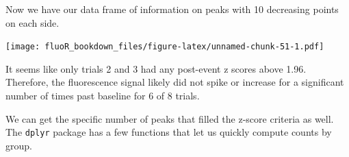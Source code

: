 \documentclass[
]{book}
\newenvironment{Shaded}{\begin{snugshade}}{\end{snugshade}}
\newcommand{\CommentTok}[1]{\textcolor[rgb]{0.56,0.35,0.01}{\textit{#1}}}
\newcommand{\ControlFlowTok}[1]{\textcolor[rgb]{0.13,0.29,0.53}{\textbf{#1}}}
\newcommand{\DataTypeTok}[1]{\textcolor[rgb]{0.13,0.29,0.53}{#1}}
\newcommand{\DecValTok}[1]{\textcolor[rgb]{0.00,0.00,0.81}{#1}}
\newcommand{\KeywordTok}[1]{\textcolor[rgb]{0.13,0.29,0.53}{\textbf{#1}}}
\newcommand{\NormalTok}[1]{#1}
\newcommand{\OperatorTok}[1]{\textcolor[rgb]{0.81,0.36,0.00}{\textbf{#1}}}
\newcommand{\StringTok}[1]{\textcolor[rgb]{0.31,0.60,0.02}{#1}}
\begin{document}
\begin{Shaded}
\end{Shaded}

Now we have our data frame of information on peaks with 10 decreasing points on each side.

\texttt{[image: fluoR\_bookdown\_files/figure-latex/unnamed-chunk-51-1.pdf]}

It seems like only trials 2 and 3 had any post-event z scores above 1.96. Therefore, the fluorescence signal likely did not spike or increase for a significant number of times past baseline for 6 of 8 trials.

We can get the specific number of peaks that filled the z-score criteria as well. The \texttt{dplyr} package has a few functions that let us quickly compute counts by group.
\end{document}
